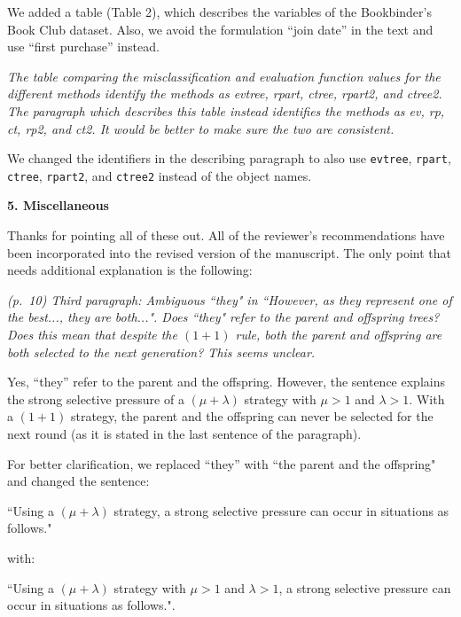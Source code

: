 \documentclass[DIN, pagenumber=false, parskip=half,%
               fromalign=left, fromphone=true,%
               fromemail=true, fromurl=false, %
               fromlogo=true, fromrule=false, fromrule=afteraddress]{scrlttr2}
\begin{document}
We added a table (Table 2), which describes the variables of the
Bookbinder's Book Club dataset. Also, we avoid the formulation ``join date''
in the text and use ``first purchase'' instead.

\medskip

\textit{The table comparing the misclassification and evaluation function values
for the different methods identify the methods as evtree, rpart, ctree, rpart2,
and ctree2. The paragraph which describes this table instead identifies the
methods as ev, rp, ct, rp2, and ct2. It would be better to make sure the two are
consistent.}

We changed the identifiers in the describing paragraph to also use \texttt{evtree},
\texttt{rpart}, \texttt{ctree}, \texttt{rpart2}, and \texttt{ctree2} instead of the
object names.

\bigskip

\textbf{5. Miscellaneous}

Thanks for pointing all of these out. All of the reviewer's recommendations
have been incorporated into the revised version of the manuscript. The only
point that needs additional explanation is the following:

\medskip

\textit{(p.~10) Third paragraph: Ambiguous ``they" in ``However, as they
represent one of the best..., they are both...". Does ``they" refer to the
parent and offspring trees? Does this mean that despite the $(1+1)$ rule, both
the parent and offspring are both selected to the next generation? This seems
unclear.}

Yes, ``they'' refer to the parent and the offspring. However, the sentence
explains the strong selective pressure of a $(\mu + \lambda)$ strategy with
$\mu>1$ and $\lambda>1$. With a $(1+1)$ strategy, the parent and the offspring
can never be selected for the next round (as it is stated in the last sentence
of the paragraph). 

For better clarification, we replaced ``they'' with ``the parent and the
offspring" and changed the sentence:

``Using a $(\mu + \lambda)$ strategy, a strong selective pressure can occur in
situations as follows."

with:

``Using a $(\mu + \lambda)$ strategy with $\mu>1$ and $\lambda>1$, a strong
selective pressure can occur in situations as follows.".
\end{document}

